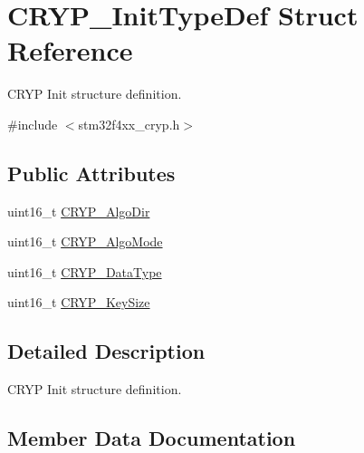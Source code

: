 \hypertarget{struct_c_r_y_p___init_type_def}{}\section{C\+R\+Y\+P\+\_\+\+Init\+Type\+Def Struct Reference}
\label{struct_c_r_y_p___init_type_def}


C\+R\+Y\+P Init structure definition.  




{\ttfamily \#include $<$stm32f4xx\+\_\+cryp.\+h$>$}

\subsection*{Public Attributes}
\begin{DoxyCompactItemize}
\item 
uint16\+\_\+t \hyperlink{struct_c_r_y_p___init_type_def_a3531fac011936e54f131224eb056c887}{C\+R\+Y\+P\+\_\+\+Algo\+Dir}
\item 
uint16\+\_\+t \hyperlink{struct_c_r_y_p___init_type_def_a984279e9849467c7dc940ffad01924f5}{C\+R\+Y\+P\+\_\+\+Algo\+Mode}
\item 
uint16\+\_\+t \hyperlink{struct_c_r_y_p___init_type_def_aeaa94577ae8ff5a34a9fcf4d6424933f}{C\+R\+Y\+P\+\_\+\+Data\+Type}
\item 
uint16\+\_\+t \hyperlink{struct_c_r_y_p___init_type_def_ace9e0f21c16a2280a6d7325517c2a9b5}{C\+R\+Y\+P\+\_\+\+Key\+Size}
\end{DoxyCompactItemize}


\subsection{Detailed Description}
C\+R\+Y\+P Init structure definition. 

\subsection{Member Data Documentation}
\hypertarget{struct_c_r_y_p___init_type_def_a3531fac011936e54f131224eb056c887}{}
